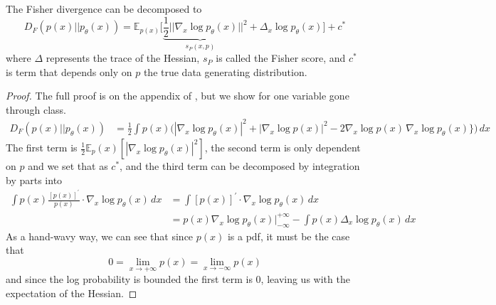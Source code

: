     \begin{theorem}
      The Fisher divergence can be decomposed to 
      \begin{equation}
        D_F (p(x) || p_\theta (x)) = \mathbb{E}_{p(x)} \bigg[ \underbrace{\frac{1}{2} || \nabla_x \log p_\theta (x)}_{s_P (x, p)} ||^2 + \Delta_x \log p_\theta (x) \bigg] + c^\ast
      \end{equation}
      where $\Delta$ represents the trace of the Hessian, $s_P$ is called the Fisher score, and $c^\ast$ is  term that depends only on $p$ the true data generating distribution. 
    \end{theorem}
    \begin{proof}
      The full proof is on the appendix of \cite{orig_score}, but we show for one variable gone through class. 
      \begin{align}
        D_F (p(x) || p_\theta (x)) & = \frac{1}{2} \int p(x) \big( |\nabla_x \log p_\theta (x)|^2 + | \nabla_x \log p(x) |^2 - 2 \nabla_x \log p(x) \, \nabla_x \log p_\theta (x)\} \big) \,dx
      \end{align}
      The first term is $\frac{1}{2} \mathbb{E}_p(x) [|\nabla_x \log p_\theta (x)|^2]$, the second term is only dependent on $p$ and we set that as $c^\ast$, and the third term can be decomposed by integration by parts into  
      \begin{align}
        \int p(x) \frac{[p(x)]^\prime}{p(x)} \cdot \nabla_x \log p_\theta (x) \,dx & = \int [p(x)]^\prime \cdot \nabla_x \log p_\theta (x) \,dx \\ 
                                           & = p(x) \nabla_x \log p_\theta (x) \Big|_{-\infty}^{+\infty} - \int p(x) \Delta_x \log p_\theta (x) \,dx 
      \end{align}
      As a hand-wavy way, we can see that since $p(x)$ is a pdf, it must be the case that 
      \begin{equation}
        0 = \lim_{x \rightarrow +\infty} p(x) = \lim_{x \rightarrow -\infty} p(x) 
      \end{equation}
      and since the log probability is bounded the first term is $0$, leaving us with the expectation of the Hessian. 
    \end{proof} 

